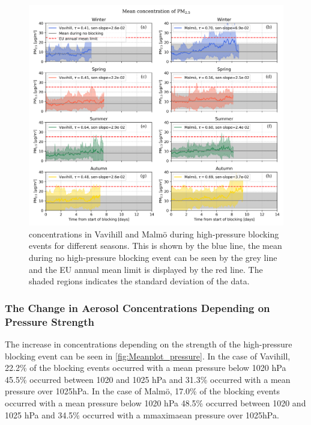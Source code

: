 \begin{figure}[H]
    \centering
    \includegraphics[width=\textwidth]{Figures/Meanplot_seasonal.png}
    \caption{\PM concentrations in Vavihill and Malmö during high-pressure blocking events for different seasons. This is shown by the blue line, the mean during no high-pressure blocking event can be seen by the grey line and the EU annual mean limit is displayed by the red line. The shaded regions indicates the standard deviation of the data.}
    \label{fig:Meanplot_seasonal}
\end{figure}
 
\subsubsection{The Change in Aerosol Concentrations Depending on Pressure Strength}
The increase in \PM  concentrations depending on the strength of the high-pressure blocking event can be seen in \autoref{fig:Meanplot_pressure}. In the case of Vavihill, 22.2\% of the blocking events occurred with a mean pressure below 1020 hPa 45.5\% occurred between 1020 and 1025 hPa and 31.3\% occurred with a mean pressure over 1025hPa. In the case of Malmö, 17.0\% of the blocking events occurred with a mean pressure below 1020 hPa 48.5\% occurred between 1020 and 1025 hPa and 34.5\% occurred with a mmaximaean pressure over 1025hPa.


